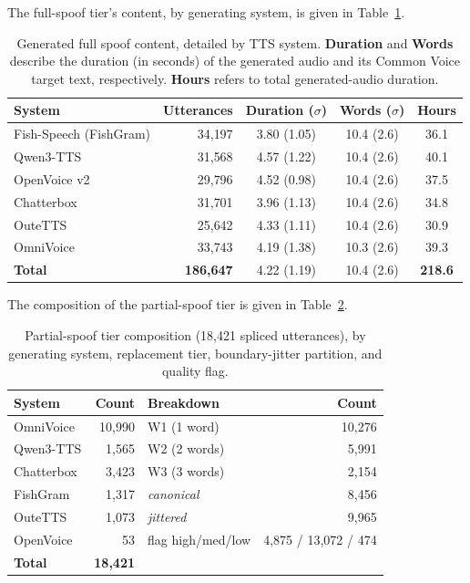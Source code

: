 \documentclass[11pt]{article}
\begin{document}
The full-spoof tier's content, by generating system, is given in
Table~\ref{tab:fullspoofdesc}.

\begin{table}[H]
\centering
\caption{Generated full spoof content, detailed by
TTS system. \textbf{Duration} and \textbf{Words} describe the
duration (in seconds) of the generated audio and its Common Voice target text, respectively. \textbf{Hours} refers to total generated-audio duration.}
\label{tab:fullspoofdesc}
\small
\begin{tabular}{lrccc}
\toprule
\textbf{System} & \textbf{Utterances} & \textbf{Duration ($\sigma$)}  & \textbf{Words ($\sigma$)} & \textbf{Hours} \\
\midrule
Fish-Speech (FishGram) & 34{,}197 & 3.80 (1.05) & 10.4 (2.6) & 36.1 \\
Qwen3-TTS              & 31{,}568 & 4.57 (1.22) & 10.4 (2.6) & 40.1 \\
OpenVoice v2           & 29{,}796 & 4.52 (0.98) & 10.4 (2.6) & 37.5 \\
Chatterbox             & 31{,}701 & 3.96 (1.13) & 10.4 (2.6) & 34.8 \\
OuteTTS                & 25{,}642 & 4.33 (1.11) & 10.4 (2.6) & 30.9 \\
OmniVoice              & 33{,}743 & 4.19 (1.38) & 10.3 (2.6) & 39.3 \\
\midrule
\textbf{Total}         & \textbf{186{,}647} & 4.22 (1.19) & 10.4 (2.6) & \textbf{218.6} \\
\bottomrule
\end{tabular}
\end{table}

The composition of the partial-spoof tier is given in
Table~\ref{tab:pscomp}.

\begin{table}[H]
\centering
\caption{Partial-spoof tier composition (18{,}421 spliced utterances),
by generating system, replacement tier, boundary-jitter partition, and
quality flag.}
\label{tab:pscomp}
\small
\begin{tabular}{lr@{\hskip 1.5em}lr}
\toprule
\textbf{System} & \textbf{Count} & \textbf{Breakdown} & \textbf{Count} \\
\midrule
OmniVoice   & 10{,}990 & W1 (1 word)       & 10{,}276 \\
Qwen3-TTS   &  1{,}565 & W2 (2 words)      &  5{,}991 \\
Chatterbox  &  3{,}423 & W3 (3 words)      &  2{,}154 \\
FishGram    &  1{,}317 & \emph{canonical}  &  8{,}456 \\
OuteTTS     &  1{,}073 & \emph{jittered}   &  9{,}965 \\
OpenVoice   &     53   & flag high/med/low & 4{,}875 / 13{,}072 / 474 \\
\midrule
\textbf{Total} & \textbf{18{,}421} & & \\
\bottomrule
\end{tabular}
\end{table}
\end{document}
